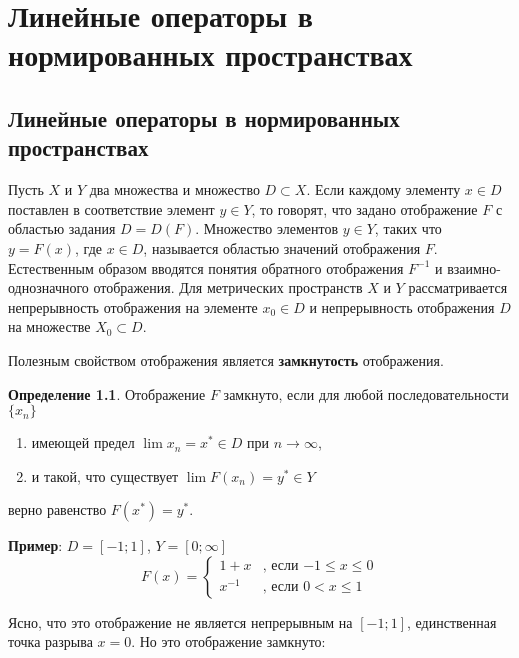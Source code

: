 \documentclass[12pt,a4paper,titlepage, oneside]{book}
\theoremstyle{definition}
\newtheorem*{definition}{Определение}
\theoremstyle{plain}
\theoremstyle{remark}
\theoremstyle{remark}
\theoremstyle{remark}
\theoremstyle{plain}
\theoremstyle{plain}
\begin{document}
\chapter{Линейные операторы в нормированных пространствах}

\section{Линейные операторы в нормированных пространствах}
Пусть $X$ и $Y$ два множества и множество $D \subset X$. Если каждому элементу $x \in D$ поставлен в соответствие элемент $y \in Y$, то говорят, что задано отображение $F$ с областью задания $D=D(F)$. Множество элементов $y \in Y$, таких что $y=F(x)$, где $x \in D$, называется областью значений отображения $F$. Естественным образом вводятся понятия обратного отображения ${F}^{-1}$ и взаимно-однозначного отображения. Для метрических пространств $X$ и $Y$ рассматривается непрерывность отображения на элементе $x_0 \in D$ и непрерывность отображения $D$ на множестве $X_0 \subset D$.

Полезным свойством отображения является \textbf{замкнутость} отображения.

\begin{definition} Отображение $F$ замкнуто, если для любой последовательности  $\lbrace x_n \rbrace$

\begin{enumerate}

 \item имеющей предел $\lim x_n= x^* \in D$ при $n\to\infty$,
 
 \item и такой, что существует $\lim F(x_n)= y^* \in Y$
 
\end{enumerate} 
 
верно равенство $F(x^*)=y^*$.

\end{definition}

\textbf{Пример}: $D=[-1;1]$, $Y=[0;\infty]$
\begin{equation*}
F(x) = 
\begin{cases}
   1+x &\text{, если $-1\leqslant x \leqslant 0$}\\
   x^{-1} &\text{, если $0< x \leqslant 1$}
\end{cases}
\end{equation*}

Ясно, что это отображение не является непрерывным на $[-1;1]$, единственная точка разрыва $x=0$. Но это отображение замкнуто:
\end{document}
